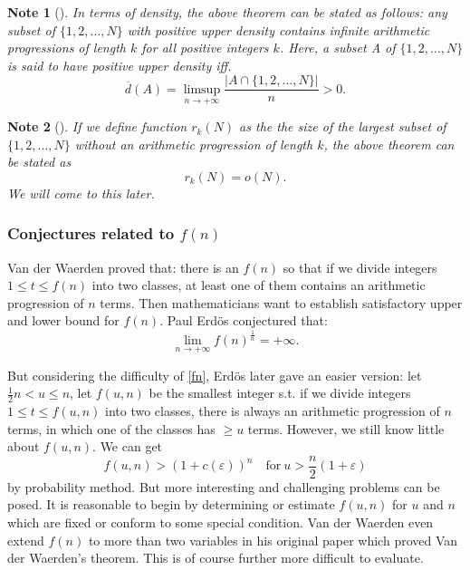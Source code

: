 \documentclass[12pt]{article}
\newtheorem{note}{Note}
\begin{document}
\begin{note}[\cite{sz}]
In terms of density\cite{density}, the above theorem can be stated as follows: any subset of $\{1, 2, \hdots, N\}$ with positive upper density contains infinite arithmetic progressions of length $k$ for all positive integers $k$. Here, a subset A of $\{1, 2,\hdots, N\}$ is said to have positive upper density iff. 
\[  \overline{d}(A) = \limsup_{n \to +\infty} \frac{|A \cap \{1, 2, \hdots, N\}|}{n} > 0. \]
\end{note}

\begin{note}[\cite{sz}]
If we define function $r_k(N)$ as the the size of the largest subset of $\{1, 2, \hdots, N\}$ without an arithmetic progression of length $k$, the above theorem can be stated as 
\[ r_k(N) = o(N). \]
We will come to this later.
\end{note}

\subsubsection{Conjectures related to $f(n)$}

Van der Waerden\cite{vanpaper} proved that: there is an $f(n)$ so that if we divide integers $1 \leq t \leq f(n)$ into two classes, at least one of them contains an arithmetic progression of $n$ terms. Then mathematicians want to establish satisfactory upper and lower bound for $f(n)$. Paul Erd\"{o}s conjectured that:
\begin{equation}\label{fn}
\lim_{n \to +\infty}f(n)^{\frac{1}{n}}=+\infty.
\end{equation}

But considering the difficulty of \eqref{fn}, Erd\"{o}s later gave an easier version: let $\frac{1}{2}n < u \leq n$, let $f(u, n)$ be the smallest integer s.t. if we divide integers $1 \leq t \leq f(u, n)$ into two classes, there is always an arithmetic progression of $n$ terms, in which one of the classes has $\geq u$ terms. However, we still know little about $f(u, n)$. We can get 
\begin{equation}
f(u, n) > (1+c(\varepsilon))^n\quad \text{for}\ u > \frac{n}{2}(1+\varepsilon)
\end{equation}
by probability method. But more interesting and challenging problems can be posed. It is reasonable to begin by determining or estimate $f(u, n)$ for $u$ and $n$ which are fixed or conform to some special condition. Van der Waerden\cite{vanpaper} even extend $f(n)$ to more than two variables in his original paper which proved Van der Waerden's theorem. This is of course further more difficult to evaluate.
\end{document}
